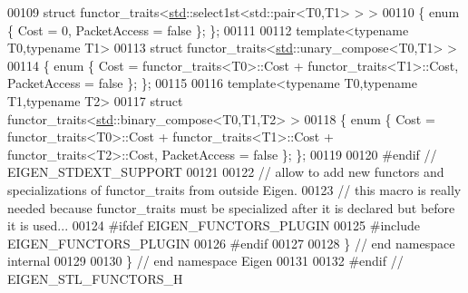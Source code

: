 \begin{DoxyCode}
00109 \textcolor{keyword}{struct }functor\_traits<\hyperlink{namespacestd}{std}::select1st<std::pair<T0,T1> > >
00110 \{ \textcolor{keyword}{enum} \{ Cost = 0, PacketAccess = \textcolor{keyword}{false} \}; \};
00111 
00112 \textcolor{keyword}{template}<\textcolor{keyword}{typename} T0,\textcolor{keyword}{typename} T1>
00113 \textcolor{keyword}{struct }functor\_traits<\hyperlink{namespacestd}{std}::unary\_compose<T0,T1> >
00114 \{ \textcolor{keyword}{enum} \{ Cost = functor\_traits<T0>::Cost + functor\_traits<T1>::Cost, PacketAccess = \textcolor{keyword}{false} \}; \};
00115 
00116 \textcolor{keyword}{template}<\textcolor{keyword}{typename} T0,\textcolor{keyword}{typename} T1,\textcolor{keyword}{typename} T2>
00117 \textcolor{keyword}{struct }functor\_traits<\hyperlink{namespacestd}{std}::binary\_compose<T0,T1,T2> >
00118 \{ \textcolor{keyword}{enum} \{ Cost = functor\_traits<T0>::Cost + functor\_traits<T1>::Cost + functor\_traits<T2>::Cost, 
      PacketAccess = \textcolor{keyword}{false} \}; \};
00119 
00120 \textcolor{preprocessor}{#endif // EIGEN\_STDEXT\_SUPPORT}
00121 
00122 \textcolor{comment}{// allow to add new functors and specializations of functor\_traits from outside Eigen.}
00123 \textcolor{comment}{// this macro is really needed because functor\_traits must be specialized after it is declared but before
       it is used...}
00124 \textcolor{preprocessor}{#ifdef EIGEN\_FUNCTORS\_PLUGIN}
00125 \textcolor{preprocessor}{#include EIGEN\_FUNCTORS\_PLUGIN}
00126 \textcolor{preprocessor}{#endif}
00127 
00128 \} \textcolor{comment}{// end namespace internal}
00129 
00130 \} \textcolor{comment}{// end namespace Eigen}
00131 
00132 \textcolor{preprocessor}{#endif // EIGEN\_STL\_FUNCTORS\_H}
\end{DoxyCode}
